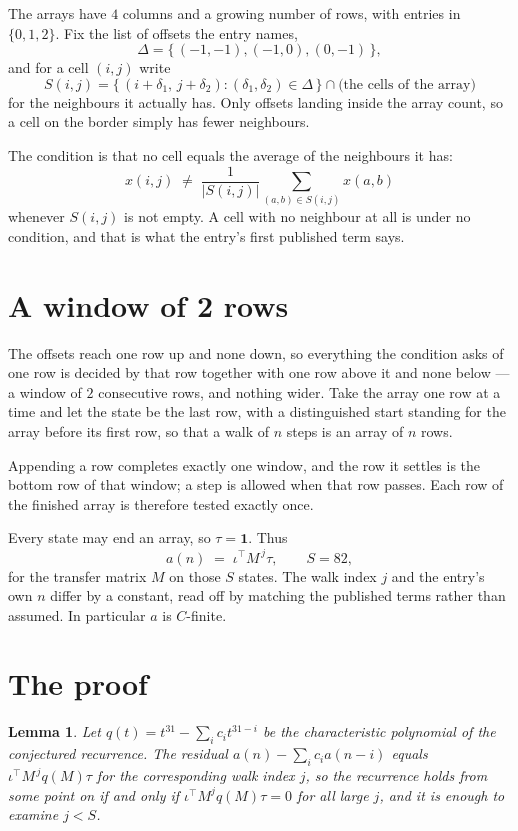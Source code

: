 \documentclass[11pt,a4paper]{article}
\theoremstyle{plain}
\newtheorem{lemma}[theorem]{Lemma}
\theoremstyle{definition}
\begin{document}
The arrays have $4$ columns and a growing number of rows, with entries in $\{0,1,2\}$. Fix the
list of offsets the entry names,
\[
\Delta=\{\,(-1,-1), (-1,0), (0,-1)\,\},
\]
and for a cell $(i,j)$ write
\[
S(i,j)=\{\,(i+\delta_1,\,j+\delta_2) : (\delta_1,\delta_2)\in\Delta\,\}\cap
\text{(the cells of the array)}
\]
for the neighbours it actually has. Only offsets landing inside the array count, so a cell on
the border simply has fewer neighbours.

The condition is that no cell equals the average of the neighbours it has:
\[
x(i,j)\;\neq\;\frac{1}{|S(i,j)|}\sum_{(a,b)\in S(i,j)}x(a,b)
\]
whenever $S(i,j)$ is not empty. A cell with no neighbour at all is under no condition, and that is what the entry's first published term says.

\section{A window of 2 rows}

The offsets reach one row up and none down, so everything the condition asks of one row is
decided by that row together with one row above it and none below --- a window of
$2$ consecutive rows, and nothing wider. Take the array one row at a time
and let the state be the last row, with a distinguished start standing for the
array before its first row, so that a walk of $n$ steps is an array of $n$ rows.

Appending a row completes exactly one window, and the row it settles is the bottom row of that window; a step is
allowed when that row passes. Each row of the finished
array is therefore tested exactly once.

Every state may end an array, so $\tau=\mathbf{1}$.
Thus
\[
a(n)\;=\;\iota^{\!\top}M^{\,j}\tau ,\qquad S=82,
\]
for the transfer matrix $M$ on those $S$ states. The walk index $j$ and the entry's own $n$
differ by a constant, read off by matching the published terms rather than assumed. In
particular $a$ is $C$-finite.

\section{The proof}

\begin{lemma}\label{lem:crit}
Let $q(t)=t^{31}-\sum_i c_it^{31-i}$ be the characteristic polynomial of the
conjectured recurrence. The residual $a(n)-\sum_ic_ia(n-i)$ equals
$\iota^{\!\top}M^{\,j}q(M)\tau$ for the corresponding walk index $j$, so the recurrence
holds from some point on if and only if $\iota^{\!\top}M^{j}q(M)\tau=0$ for all large $j$,
and it is enough to examine $j<S$.
\end{lemma}
\end{document}
